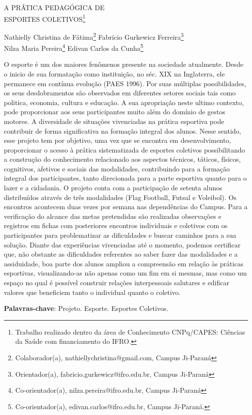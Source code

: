 \documentclass[article,12pt,onesidea,4paper,english,brazil]{abntex2}
\begin{document}
	
	
	\frenchspacing 
	
	\begin{center}
		\LARGE A PRÁTICA PEDAGÓGICA DE\\ESPORTES COLETIVOS\footnote{Trabalho realizado dentro da área de Conhecimento CNPq/CAPES: Ciências da Saúde com financiamento do IFRO.}
		
		\normalsize
		Nathielly Christina de Fátima\footnote{Colaborador(a), nathiellychristina@gmail.com, Campus Ji-Paraná} 
		Fabrício Gurkewicz Ferreira\footnote{Orientador(a), fabricio.gurkewicz@ifro.edu.br, Campus Ji-Paraná} \\
		Nilza Maria Pereira\footnote{Co-orientador(a), nilza.pereira@ifro.edu.br, Campus Ji-Paraná} 
		Edivan Carlos da Cunha\footnote{Co-orientador(a), edivan.carlos@ifro.edu.br, Campus Ji-Paraná.} 
	\end{center}
	
	\noindent O esporte é um dos maiores fenômenos presente na sociedade atualmente. Desde o inicio de sua formatação como instituição, no séc. XIX na Inglaterra, ele permanece em contínua evolução (PAES 1996). Por suas múltiplas possibilidades, os seus desdobramentos são observados em diferentes setores sociais tais como politica, economia, cultura e educação. A sua apropriação neste ultimo contexto, pode proporcionar aos seus participantes muito além do domínio de gestos motores. A diversidade de situações vivenciadas na prática esportiva pode contribuir de forma significativa na formação integral dos alunos. Nesse sentido, esse projeto tem por objetivo, uma vez que se encontra em desenvolvimento, proporcionar o acesso à prática sistematizada de esportes coletivos possibilitando a construção do conhecimento relacionado aos aspectos técnicos, táticos, físicos, cognitivos, afetivos e sociais das modalidades, contribuindo para a formação integral dos participantes, tanto direcionada para a parte esportiva quanto para o lazer e a cidadania. O projeto conta com a participação de setenta alunos distribuídos através de três modalidades (Flag Football, Futsal e Voleibol). Os encontros acontecem duas vezes por semana nas dependências do Campus. Para a verificação do alcance das metas pretendidas são realizadas observações e registros em fichas com posteriores encontros individuais e coletivos com os participantes para problematizar as dificuldades e buscar caminhos para a sua solução. Diante das experiências vivenciadas até o momento, podemos certificar que, não obstante as dificuldades referentes ao saber fazer das modalidades e a assiduidade, boa parte dos alunos ampliou a compreensão em relação às práticas esportivas, visualizando-as não apenas como um fim em si mesmas, mas como um espaço no qual é possível construir relações interpessoais salutares e edificar valores que beneficiem tanto o individual quanto o coletivo.
	
	\vspace{\onelineskip}
	
	\noindent
	\textbf{Palavras-chave}: Projeto. Esporte. Esportes Coletivos.
	
\end{document}
